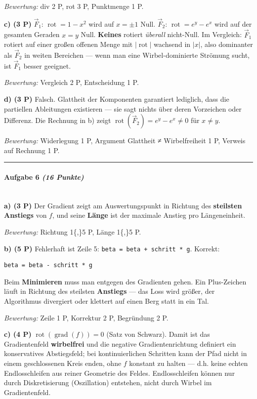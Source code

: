 \documentclass[11pt, a4paper]{article}
\begin{document}
\textit{Bewertung:} div 2 P, rot 3 P, Punktmenge 1 P.


\textbf{c) (3 P)} $\vec{F}_1$: $\operatorname{rot} = 1-x^2$ wird auf $x=\pm 1$ Null. $\vec{F}_2$: $\operatorname{rot} = e^y - e^x$ wird auf der gesamten Geraden $x=y$ Null. \textbf{Keines} rotiert \textit{überall} nicht-Null. Im Vergleich: $\vec{F}_1$ rotiert auf einer großen offenen Menge mit $|\operatorname{rot}|$ wachsend in $|x|$, also dominanter als $\vec{F}_2$ in weiten Bereichen — wenn man eine Wirbel-dominierte Strömung sucht, ist $\vec{F}_1$ besser geeignet.

\textit{Bewertung:} Vergleich 2 P, Entscheidung 1 P.


\textbf{d) (3 P)} Falsch. Glattheit der Komponenten garantiert lediglich, dass die partiellen Ableitungen existieren — sie sagt nichts über deren Vorzeichen oder Differenz. Die Rechnung in b) zeigt $\operatorname{rot}(\vec{F}_2) = e^y - e^x \neq 0$ für $x\neq y$.

\textit{Bewertung:} Widerlegung 1 P, Argument Glattheit ≠ Wirbelfreiheit 1 P, Verweis auf Rechnung 1 P.



\noindent\textcolor{rulegray}{\rule{\linewidth}{0.4pt}}


\paragraph{Aufgabe 6 \textit{(16 Punkte)}}\mbox{}\\[2pt]

\textbf{a) (3 P)} Der Gradient zeigt am Auswertungspunkt in Richtung des \textbf{steilsten Anstiegs} von $f$, und seine \textbf{Länge} ist der maximale Anstieg pro Längeneinheit.

\textit{Bewertung:} Richtung 1\{,\}5 P, Länge 1\{,\}5 P.


\textbf{b) (5 P)} Fehlerhaft ist Zeile 5: \texttt{beta = beta + schritt * g}. Korrekt:

\begin{lstlisting}
beta = beta - schritt * g
\end{lstlisting}

Beim \textbf{Minimieren} muss man entgegen des Gradienten gehen. Ein Plus-Zeichen läuft in Richtung des steilsten \textbf{Anstiegs} — das Loss wird größer, der Algorithmus divergiert oder klettert auf einen Berg statt in ein Tal.

\textit{Bewertung:} Zeile 1 P, Korrektur 2 P, Begründung 2 P.


\textbf{c) (4 P)} $\operatorname{rot}(\operatorname{grad}(f)) = 0$ (Satz von Schwarz). Damit ist das Gradientenfeld \textbf{wirbelfrei} und die negative Gradientenrichtung definiert ein konservatives Abstiegsfeld; bei kontinuierlichen Schritten kann der Pfad nicht in einem geschlossenen Kreis enden, ohne $f$ konstant zu halten — d.h. keine echten Endlosschleifen aus reiner Geometrie des Feldes. Endlosschleifen können nur durch Diskretisierung (Oszillation) entstehen, nicht durch Wirbel im Gradientenfeld.
\end{document}
